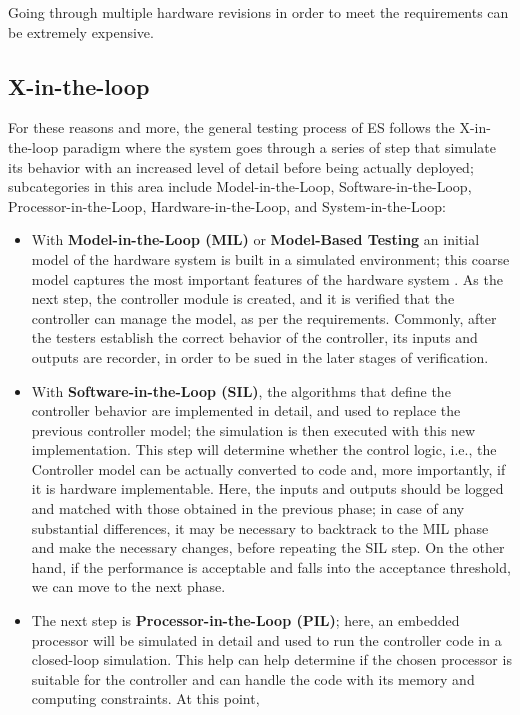 Going through multiple hardware revisions in order to meet the requirements can be extremely expensive.

\subsection{X-in-the-loop}
For these reasons and more, the general testing process of ES follows the X-in-the-loop paradigm \cite{DBLP:journals/software/GarousiFKY18} where the system goes through a series of step that simulate its behavior with an increased level of detail before being actually deployed; subcategories in this area include Model-in-the-Loop, Software-in-the-Loop, Processor-in-the-Loop, Hardware-in-the-Loop, and System-in-the-Loop:
\begin{itemize}
    \item With \textbf{Model-in-the-Loop (MIL)} or \textbf{Model-Based Testing} an initial model of the hardware system is built in a simulated environment; this coarse model captures the most important features of the hardware system \cite{XLoop}. As the next step, the controller module is created, and it is verified that the controller can manage the model, as per the requirements. Commonly, after the testers establish the correct behavior of the controller, its inputs and outputs are recorder, in order to be sued in the later stages of verification.
    \item With \textbf{Software-in-the-Loop (SIL)}, the algorithms that define the controller behavior are implemented in detail, and used to replace the previous controller model; the simulation is then executed with this new implementation. This step will determine whether the control logic, i.e., the Controller model can be actually converted to code and, more importantly, if it is hardware implementable. Here, the inputs and outputs should be logged and matched with those obtained in the previous phase; in case of any substantial differences, it may be necessary to backtrack to the MIL phase and make the necessary changes, before repeating the SIL step. On the other hand, if the performance is acceptable and falls into the acceptance threshold, we can move to the next phase.
    \item The next step is \textbf{Processor-in-the-Loop (PIL)}; here, an embedded processor will be simulated in detail and used to run the controller code in a closed-loop simulation. This help can help determine if the chosen processor is suitable for the controller and can handle the code with its memory and computing constraints. At this point, 

\end{itemize}
